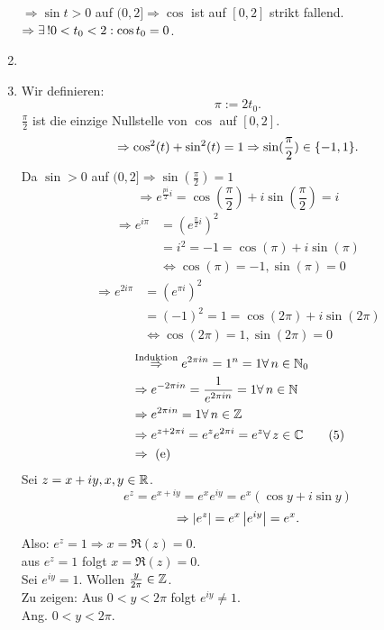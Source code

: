 \documentclass[../ana2.tex]{subfiles}
\begin{document}
\begin{bew}
\begin{enumerate}[label=(\alph*)]
\( \Rightarrow \sin t > 0 \) auf \( (0,2] 
\Rightarrow \cos \) ist auf \( [0,2] \) strikt fallend. \\
\( \Rightarrow \existse 0 < t_0 < 2: \cos t_0 = 0 \).\\
\item \item Wir definieren:
\[ \pi := 2 t_0. \]
\( \frac{\pi}{2} \) ist die einzige Nullstelle 
von \( \cos \) auf \( [0,2] \).\\
\[ \Rightarrow \cos^2(t) + \sin^2(t) = 1 
\Rightarrow \sin(\frac{\pi}{2}) \in \{-1, 1\}. \]
Da \( \sin > 0 \) auf \( (0, 2] \Rightarrow \sin(\frac{\pi}{2}) = 1 \)
\[ \Rightarrow e^{\frac{pi}{2} i} 
= \cos(\frac{\pi}{2}) + i \sin(\frac{\pi}{2}) = i \tag{4} \]
\begin{align*}
    \Rightarrow e^{i\pi} &= (e^{\frac{\pi}{2}i})^2 \\
    &= i^2 = -1 = \cos(\pi) + i\sin (\pi) \\
    &\Leftrightarrow \cos(\pi) = -1, \sin(\pi) = 0
\end{align*}
\begin{align*}
    \Rightarrow e^{2i\pi} &= (e^{\pi i})^2 \\
    &= (-1)^2 = 1 = \cos(2\pi) + i\sin(2\pi) \\ 
    &\Leftrightarrow \cos(2\pi) = 1, \sin(2\pi) = 0
\end{align*}
\begin{align*}
    &\oversett{Induktion}{\Rightarrow} e^{2 \pi i n} = 1^n 
    = 1 \forall n\in\N_0 \\
    &\Rightarrow e^{-2\pi i n} = \frac{1}{e^{2 \pi i n}} 
    = 1 \forall n\in\N \\
    &\Rightarrow e^{2 \pi i n} = 1 \forall n \in \Z \\
    &\Rightarrow e^{z + 2 \pi i} = e^z e^{2\pi i} 
    = e^z \forall z\in\C \tag{5} \\
    &\Rightarrow \text{ (e)}
\end{align*}
Sei \( z = x + iy, x,y \in\mathbb{R} \).
\[ e^z = e^{x+iy} = e^x e^{iy} = e^x(\cos y + i \sin y) \]
\[ \Rightarrow \left|e^z\right| = e^x \left|e^{iy}\right| = e^x. \]
Also: \( e^z = 1 \Rightarrow x = \Re(z) = 0 \).\\
\Dphp{} aus \( e^z = 1 \) folgt \(x = \Re(z) = 0 \).\\
Sei \( e^{iy} = 1 \). Wollen \( \frac{y}{2\pi} \in \mathbb{Z} \).\\
Zu zeigen: Aus \( 0 < y < 2\pi \) folgt \( e^{iy} \neq 1 \).\\
Ang. \( 0 < y < 2\pi \). \\

\end{enumerate}
\end{bew}
\end{document}
